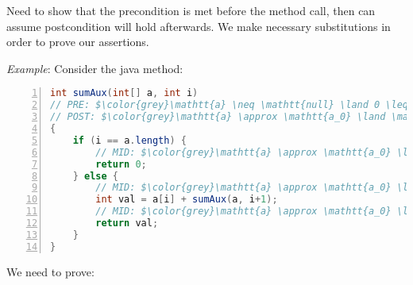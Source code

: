 \documentclass[10pt,twoside,twocolumn]{article}
\begin{document}
Need to show that the precondition is met before the method call,
then can assume postcondition will hold afterwards. We make necessary
substitutions in order to prove our assertions.

\emph{Example}: Consider the java method:
\begin{lstlisting}[language=Java,numbers=left,numberstyle={\footnotesize},basicstyle={\small\ttfamily},tabsize=4,mathescape=true,xleftmargin={5.0ex},commentstyle={\color{grey}}]
int sumAux(int[] a, int i)
// PRE: $\color{grey}\mathtt{a} \neq \mathtt{null} \land 0 \leq \mathtt{i} \leq \mathtt{a.length}$
// POST: $\color{grey}\mathtt{a} \approx \mathtt{a_0} \land \mathtt{r} = \sum \mathtt{a}[\mathtt{i}..\mathtt{a.length})$
{
	if (i == a.length) {
		// MID: $\color{grey}\mathtt{a} \approx \mathtt{a_0} \land \mathtt{i} = \mathtt{a.length}$
		return 0;
	} else {
		// MID: $\color{grey}\mathtt{a} \approx \mathtt{a_0} \land \mathtt{a} \neq \mathtt{null} \land 0 \leq \mathtt{i} < \mathtt{a.length}$
		int val = a[i] + sumAux(a, i+1);
		// MID: $\color{grey}\mathtt{a} \approx \mathtt{a_0} \land \mathtt{val} = \sum \mathtt{a}[\mathtt{i}..\mathtt{a.length})$
		return val;
	}
}
\end{lstlisting}
We need to prove:
\end{document}
